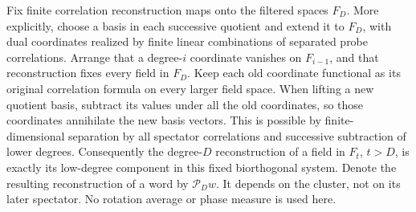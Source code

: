 Fix finite correlation reconstruction maps onto the filtered spaces $F_D$.
More explicitly, choose a basis in each successive quotient and
extend it to $F_D$, with dual coordinates realized by finite
linear combinations of separated probe correlations. Arrange that
a degree-$i$ coordinate vanishes on $F_{i-1}$, and that reconstruction
fixes every field in $F_D$. Keep each old coordinate functional as
its original correlation formula on every larger field space. When
lifting a new quotient basis, subtract its values under all the old
coordinates, so those coordinates annihilate the new basis vectors.
This is possible by finite-dimensional separation by all spectator
correlations and successive subtraction of lower degrees. Consequently
the degree-$D$ reconstruction of a field in $F_t$, $t>D$, is exactly its
low-degree component in this fixed biorthogonal system. Denote the resulting reconstruction of a word by
$\mathcal P_Dw$. It depends on the cluster, not on its later spectator.
No rotation average or phase measure is used here.

